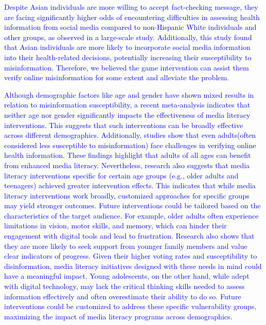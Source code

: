 \textcolor{blue}{Despite Asian individuals are more willing to accept fact-checking message, they are facing significantly higher odds of encountering difficulties in assessing health information from social media compared to non-Hispanic White individuals and other groups, as observed in a large-scale study\cite{chandrasekaran2024racial}. Additionally, this study found that Asian individuals are more likely to incorporate social media information into their health-related decisions, potentially increasing their susceptibility to misinformation\cite{chandrasekaran2024racial}. Therefore, we believed the game intervention can assist them verify online misinformation for some extent and alleviate the problem.}

\textcolor{blue}{Although demographic factors like age and gender have shown mixed results in relation to misinformation susceptibility, a recent meta-analysis indicates that neither age nor gender significantly impacts the effectiveness of media literacy interventions. This suggests that such interventions can be broadly effective across different demographics\cite{lu2024can}. Additionally, studies show that even adults(often considered less susceptible to misinformation) face challenges in verifying online health information\cite{chandrasekaran2024racial,reuters2023dnr}. These findings highlight that adults of all ages can benefit from enhanced media literacy. Nevertheless, research also suggests that media literacy interventions specific for certain age groups (e.g., older adults and teenagers) achieved greater intervention effects\cite{moore2022digital,hartwig2024adolescents}. This indicates that while media literacy interventions work broadly, customized approaches for specific groups may yield stronger outcomes. Future interventions could be tailored based on the characteristics of the target audience. For example, older adults often experience limitations in vision, motor skills, and memory, which can hinder their engagement with digital tools and lead to frustration\cite{wildenbos2018aging}. Research also shows that they are more likely to seek support from younger family members and value clear indicators of progress\cite{vaswani2023novel}. Given their higher voting rates and susceptibility to disinformation\cite{aarp2018oldervoters}, media literacy initiatives designed with these needs in mind could have a meaningful impact. Young adolescents, on the other hand, while adept with digital technology, may lack the critical thinking skills needed to assess information effectively and often overestimate their ability to do so\cite{papapicco2022adolescents,porat2018measuring}. Future interventions could be customized to address these specific vulnerability groups, maximizing the impact of media literacy programs across demographics.}


